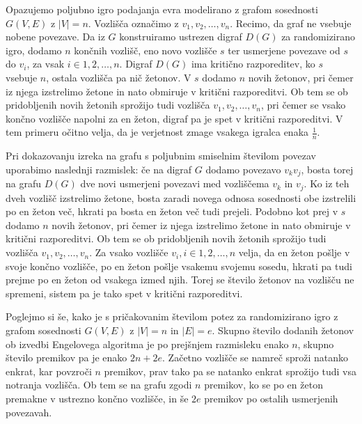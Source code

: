 \documentclass[twoside,11pt]{article}
\begin{document}
\begin{dokaz}
   Opazujemo poljubno igro podajanja evra modelirano z grafom sosednosti $G(V,E)$ z \newline 
   $|V|=n$. Vozlišča označimo z $v_1,v_2,\ldots,v_n$. 
   Recimo, da graf ne vsebuje nobene povezave.
   Da iz $G$ konstruiramo ustrezen digraf $D(G)$ za randomizirano igro, dodamo $n$ končnih vozlišč, eno novo vozlišče $s$ ter usmerjene povezave od $s$ do $v_i$, za vsak $ i\in {1,2,\ldots,n}$.
   Digraf $D(G)$ ima kritično razporeditev, ko $s$ vsebuje $n$, ostala vozlišča pa nič žetonov. V $s$ dodamo $n$ novih žetonov, pri čemer iz njega izstrelimo žetone in nato obmiruje v kritični razporeditvi.
   Ob tem se ob pridobljenih novih žetonih sprožijo tudi vozlišča $v_1,v_2,\ldots,v_n$, pri čemer se vsako končno vozlišče napolni za en žeton, digraf pa je spet v kritični razporeditvi.
   V tem primeru očitno velja, da je verjetnost zmage vsakega igralca enaka $\frac{1}{n}$.

   Pri dokazovanju izreka na grafu s poljubnim smiselnim številom povezav uporabimo naslednji razmislek: če na digraf $G$ dodamo povezavo $v_kv_j$, bosta torej na grafu $D(G)$ dve novi usmerjeni povezavi med vozliščema $v_k$ in $v_j$.
   Ko iz teh dveh vozlišč izstrelimo žetone, bosta zaradi novega odnosa sosednosti obe izstrelili po en žeton več, hkrati pa bosta en žeton več tudi prejeli. Podobno kot prej v $s$ dodamo $n$ novih žetonov, pri čemer iz njega izstrelimo žetone in nato obmiruje v kritični razporeditvi.
   Ob tem se ob pridobljenih novih žetonih sprožijo tudi vozlišča $v_1,v_2,\ldots,v_n$. Za vsako vozlišče $v_i, i\in{1,2,\ldots,n}$ velja, da en žeton pošlje v svoje končno vozlišče, po en žeton pošlje vsakemu svojemu sosedu, hkrati pa tudi prejme po en žeton od vsakega izmed njih.
   Torej se število žetonov na vozlišču ne spremeni, sistem pa je tako spet v kritični razporeditvi.
   \hfill \QED

\end{dokaz}

Poglejmo si še, kako je s pričakovanim številom potez za randomizirano igro z grafom sosednosti $G(V,E)$ z $|V|=n$ in $|E|=e$. Skupno število dodanih žetonov ob izvedbi Engelovega algoritma 
je po prejšnjem razmisleku enako $n$, skupno število premikov pa je enako $2n+2e$. Začetno vozlišče se namreč sproži natanko enkrat, kar povzroči $n$ premikov, 
prav tako pa se natanko enkrat sprožijo tudi vsa notranja vozlišča. 
Ob tem se na grafu zgodi $n$ premikov, ko se po en žeton premakne v ustrezno končno vozlišče, in še $2e$ premikov po ostalih usmerjenih povezavah. 
\end{document}
